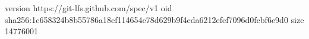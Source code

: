 version https://git-lfs.github.com/spec/v1
oid sha256:1c658324b8b55786a18ef114654c78d629b9f4eda6212efef7096d0fcbf6c9d0
size 14776001

